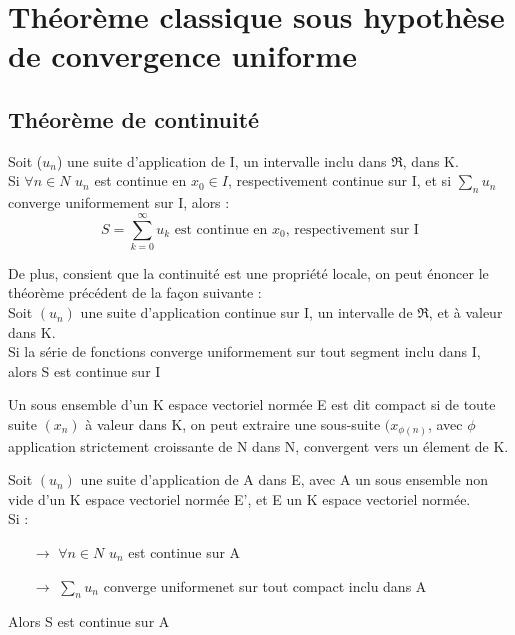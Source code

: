 \section{Théorème classique sous hypothèse de convergence uniforme}
\subsection{Théorème de continuité}
\begin{theo}
Soit ($u_n$) une suite d'application de I, un intervalle inclu dans $\Re$, dans K.\\
Si $\forall n \in N$ $u_n$ est continue en $x_0 \in I$, respectivement continue sur I, et si $\underset{n} \sum u_n$ converge uniformement sur I, alors :
$$S = \sum_{k=0}^{\infty} u_k \mbox{ est continue en }x_0\mbox{, respectivement sur I}$$
\end{theo}
\begin{theo}
De plus, consient que la continuité est une propriété locale, on peut énoncer le théorème précédent de la façon suivante :\\
Soit $(u_n)$ une suite d'application continue sur I, un intervalle de $\Re$, et à valeur dans K.\\
Si la série de fonctions converge uniformement sur tout segment inclu dans I, alors S est continue sur I
\end{theo}
\begin{de}
Un sous ensemble d'un K espace vectoriel normée E est dit compact si de toute suite $(x_n)$ à valeur dans K, on peut extraire une sous-suite $(x_{\phi(n)}$, avec $\phi$ application strictement croissante de N dans N, convergent vers un élement de K.
\end{de}
\begin{gene}
Soit $(u_n)$ une suite d'application de A dans E, avec A un sous ensemble non vide d'un K espace vectoriel normée E', et E un K espace vectoriel normée.\\
Si : \\
\begin{itemize}
 \item[$\rightarrow$] $\forall n \in N$ $u_n$ est continue sur A\\
 \item[$\rightarrow$] $\underset{n} \sum u_n$ converge uniformenet sur tout compact inclu dans A\\
\end{itemize}
Alors S est continue sur A
\end{gene}
